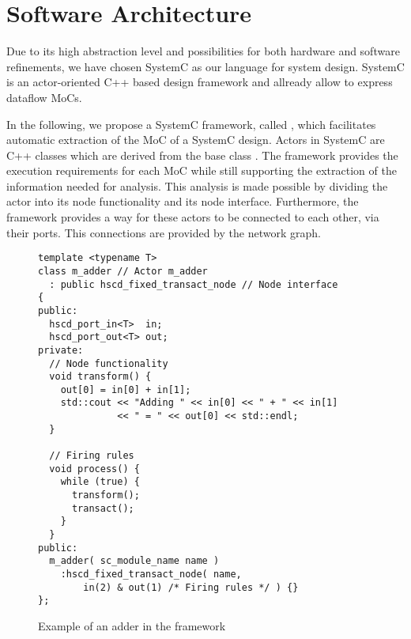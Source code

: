 \section{Software Architecture}\label{software-architecture}

Due to its high abstraction level and possibilities for both
hardware and software refinements, we have chosen SystemC
\cite{systemc-lrm:2003} \cite{glms:2002} as our language for system design.
SystemC is an actor-oriented C++ based design framework and
allready allow to express dataflow MoCs. 

In the following, we propose a SystemC framework, called \SysteMoC, which
facilitates automatic extraction of the MoC of a SystemC design.
Actors in SystemC are C++ classes which are derived from the base class .
The \SysteMoC{} framework provides the execution requirements for each MoC while
still supporting the extraction of the information needed for analysis.
This analysis is made possible by dividing the actor into its
node functionality and its node interface.
Furthermore, the \SysteMoC{} framework provides a way for these
actors to be connected to each other, via their ports. This connections
are provided by the network graph.

\begin{figure}
\centering
\begin{verbatim}
template <typename T>
class m_adder // Actor m_adder
  : public hscd_fixed_transact_node // Node interface
{
public:
  hscd_port_in<T>  in;
  hscd_port_out<T> out;
private:
  // Node functionality
  void transform() {
    out[0] = in[0] + in[1];
    std::cout << "Adding " << in[0] << " + " << in[1]
              << " = " << out[0] << std::endl;
  }
  
  // Firing rules
  void process() {
    while (true) {
      transform();
      transact();
    }
  }
public:
  m_adder( sc_module_name name )
    :hscd_fixed_transact_node( name,
        in(2) & out(1) /* Firing rules */ ) {}
};
\end{verbatim}
\caption{\label{example-adder-actor}Example of an adder in the \SysteMoC{} framework}
\end{figure}

